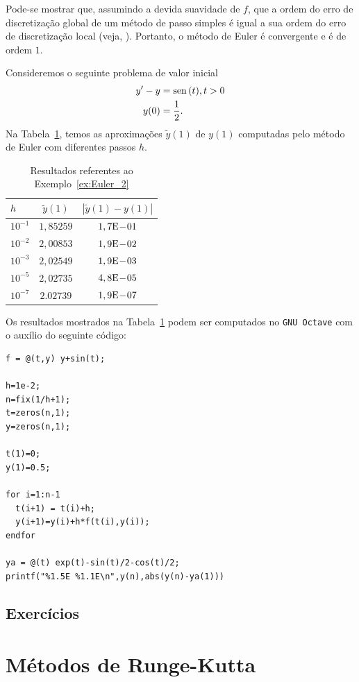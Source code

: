 \begin{obs}
  Pode-se mostrar que, assumindo a devida suavidade de $f$, que a ordem do erro de discretização global de um método de passo simples é igual a sua ordem do erro de discretização local (veja, \cite[Cap. 7, Sec. 7.2]{Stoer1993a}). Portanto, o método de Euler é convergente e é de ordem $1$.
\end{obs}

\begin{ex}\label{ex:Euler_1}
  Consideremos o seguinte problema de valor inicial
  \begin{align}
    y' - y &= \operatorname{sen}\,(t), t>0\label{eq:Euler_aux2}\\
    y(0) &= \frac{1}{2}.
  \end{align}
  Na Tabela~\ref{tab:ex_Euler_2}, temos as aproximações $\tilde{y}(1)$ de $y(1)$ computadas pelo método de Euler com diferentes passos $h$.
 
  \begin{table}[h!]
    \centering
    \begin{tabular}{l|cc}
      $h$ & $\tilde{y}(1)$ & $|\tilde{y}(1)-y(1)|$\\\hline
      $10^{-1}$ & $1,85259$ & $1,7\mathrm{E}\!-\!01$ \\
      $10^{-2}$ & $2,00853$ & $1,9\mathrm{E}\!-\!02$ \\
      $10^{-3}$ & $2,02549$ & $1,9\mathrm{E}\!-\!03$ \\
      $10^{-5}$ & $2,02735$ & $4,8\mathrm{E}\!-\!05$ \\
      $10^{-7}$ & $2.02739$ & $1,9\mathrm{E}\!-\!07$ \\\hline
    \end{tabular}
    \caption{Resultados referentes ao Exemplo~\ref{ex:Euler_2}}
    \label{tab:ex_Euler_2}
  \end{table}

\ifisoctave
Os resultados mostrados na Tabela~\ref{tab:ex_Euler_2} podem ser computados no \verb+GNU Octave+ com o auxílio do seguinte código:
\begin{verbatim}
f = @(t,y) y+sin(t);

h=1e-2;
n=fix(1/h+1);
t=zeros(n,1);
y=zeros(n,1);

t(1)=0;
y(1)=0.5;

for i=1:n-1
  t(i+1) = t(i)+h;
  y(i+1)=y(i)+h*f(t(i),y(i));
endfor

ya = @(t) exp(t)-sin(t)/2-cos(t)/2;
printf("%1.5E %1.1E\n",y(n),abs(y(n)-ya(1)))
\end{verbatim}
\fi
\end{ex}

\subsection*{Exercícios}

\emconstrucao

\section{Métodos de Runge-Kutta}\label{cap_pvi_sec_RK}

\emconstrucao